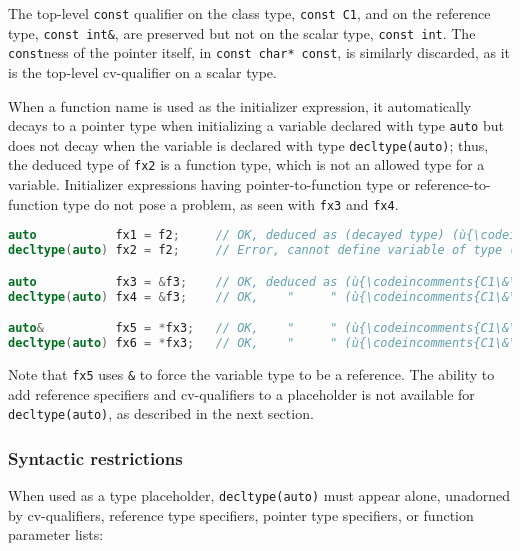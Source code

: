 The top-level \lstinline!const! qualifier on the class type,
\lstinline!const!~\lstinline!C1!, and on the reference type,
\lstinline!const!~\lstinline!int&!, are preserved but not on the scalar type,
\lstinline!const!~\lstinline!int!. The \lstinline!const!ness of the pointer
itself, in \lstinline!const!~\lstinline!char*!~\lstinline!const!, is similarly
discarded, as it is the top-level cv-qualifier on a scalar type.

When a function name is used as the initializer expression, it
automatically decays to a pointer type when initializing a variable
declared with type \lstinline!auto! but does not decay when the variable is
declared with type \lstinline!decltype(auto)!; thus, the deduced type of
\lstinline!fx2! is a function type, which is not an allowed type for a
variable. Initializer expressions having pointer-to-function type or
reference-to-function type do not pose a problem, as seen with
\lstinline!fx3! and \lstinline!fx4!.

\begin{lstlisting}[language=C++]
auto           fx1 = f2;     // OK, deduced as (decayed type) (ù{\codeincomments{int\& (*)()}}ù)
decltype(auto) fx2 = f2;     // Error, cannot define variable of type (ù{\codeincomments{int\&()}}ù)

auto           fx3 = &f3;    // OK, deduced as (ù{\codeincomments{C1\&\& (*)()}}ù)
decltype(auto) fx4 = &f3;    // OK,    "     " (ù{\codeincomments{C1\&\& (*)()}}ù)

auto&          fx5 = *fx3;   // OK,    "     " (ù{\codeincomments{C1\&\& (\&)()}}ù)
decltype(auto) fx6 = *fx3;   // OK,    "     " (ù{\codeincomments{C1\&\& (\&)()}}ù)
\end{lstlisting}
    

Note that \lstinline!fx5! uses \lstinline!&! to force the variable type to be
a reference. The ability to add reference specifiers and cv-qualifiers
to a placeholder is not available for \lstinline!decltype(auto)!, as
described in the next section.

\subsubsection[Syntactic restrictions]{Syntactic restrictions}\label{syntactic-restrictions}

When used as a type placeholder, \lstinline!decltype(auto)! must appear
alone, unadorned by cv-qualifiers, reference type specifiers, pointer
type specifiers, or function parameter lists:

